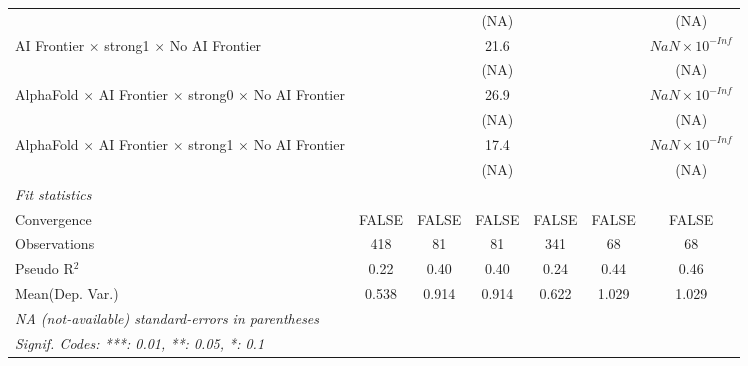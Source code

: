 \begin{tabular}{lcccccc}
                                                                              &                        &       & (NA)   &                        &                        & (NA)\\   
   AI Frontier $\times$ strong1 $\times$ No AI Frontier                       &                        &       & 21.6   &                        &                        & $NaN\times 10^{-Inf}$\\    
                                                                              &                        &       & (NA)   &                        &                        & (NA)\\   
   AlphaFold $\times$ AI Frontier $\times$ strong0 $\times$ No AI Frontier    &                        &       & 26.9   &                        &                        & $NaN\times 10^{-Inf}$\\    
                                                                              &                        &       & (NA)   &                        &                        & (NA)\\   
   AlphaFold $\times$ AI Frontier $\times$ strong1 $\times$ No AI Frontier    &                        &       & 17.4   &                        &                        & $NaN\times 10^{-Inf}$\\    
                                                                              &                        &       & (NA)   &                        &                        & (NA)\\   
   \midrule
   \emph{Fit statistics}\\
   Convergence                                                                &FALSE                   & FALSE & FALSE  & FALSE                  & FALSE                  & FALSE\\  
   Observations                                                               & 418                    & 81    & 81     & 341                    & 68                     & 68\\  
   Pseudo R$^2$                                                               & 0.22                   & 0.40  & 0.40   & 0.24                   & 0.44                   & 0.46\\  
Mean(Dep. Var.) & 0.538 & 0.914 & 0.914 & 0.622 & 1.029 & 1.029 \\
   \midrule \midrule
   \multicolumn{7}{l}{\emph{NA (not-available) standard-errors in parentheses}}\\
   \multicolumn{7}{l}{\emph{Signif. Codes: ***: 0.01, **: 0.05, *: 0.1}}\\
\end{tabular}
\par\endgroup
